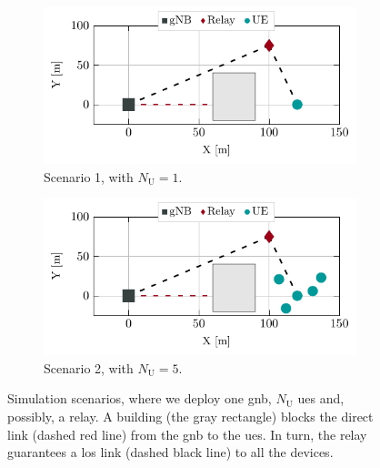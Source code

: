 \begin{figure}[t!]
  \centering
    \begin{subfigure}[t]{0.8\columnwidth}
    \includegraphics[width=1\columnwidth]{Figures/IrsSimulation/Scenario1.pdf}
    \caption{Scenario 1, with $N_{\mathrm U} = 1$.}
    \label{Fig:s1}
    \end{subfigure}
     \begin{subfigure}[t]{0.8\columnwidth}
    \includegraphics[width=1\columnwidth]{Figures/IrsSimulation/Scenario2.pdf}
    \caption{Scenario 2, with $N_{\mathrm U} = 5$.}
    \label{Fig:s2}
    \end{subfigure}
     \caption{Simulation scenarios, where we deploy one \gls{gnb}, $N_{\mathrm U}$ \glspl{ue} and, possibly, a relay. A building (the gray rectangle) blocks the direct link (dashed red line) from the \gls{gnb} to the \glspl{ue}. In turn, the relay guarantees a \gls{los} link (dashed black line) to all the devices.}
    \label{Fig:scenarios}
\end{figure}

